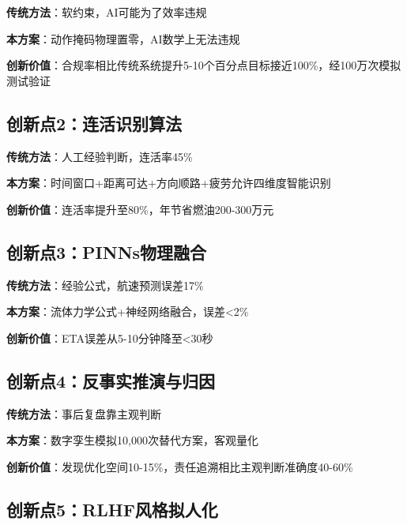 \documentclass[12pt,a4paper]{article}
\begin{document}
\begin{tcolorbox}[colback=red!5!white,colframe=red!75!black,title=创新对比]
\textbf{传统方法}：软约束，AI可能为了效率违规

\textbf{本方案}：动作掩码物理置零，AI数学上无法违规

\textbf{创新价值}：合规率相比传统系统提升5-10个百分点目标接近100\%，经100万次模拟测试验证
\end{tcolorbox}

\subsection{创新点2：连活识别算法}

\begin{tcolorbox}[colback=green!5!white,colframe=green!75!black,title=创新对比]
\textbf{传统方法}：人工经验判断，连活率45\%

\textbf{本方案}：时间窗口+距离可达+方向顺路+疲劳允许四维度智能识别

\textbf{创新价值}：连活率提升至80\%，年节省燃油200-300万元
\end{tcolorbox}

\subsection{创新点3：PINNs物理融合}

\begin{tcolorbox}[colback=blue!5!white,colframe=blue!75!black,title=创新对比]
\textbf{传统方法}：经验公式，航速预测误差17\%

\textbf{本方案}：流体力学公式+神经网络融合，误差<2\%

\textbf{创新价值}：ETA误差从5-10分钟降至<30秒
\end{tcolorbox}

\subsection{创新点4：反事实推演与归因}

\begin{tcolorbox}[colback=orange!5!white,colframe=orange!75!black,title=创新对比]
\textbf{传统方法}：事后复盘靠主观判断

\textbf{本方案}：数字孪生模拟10,000次替代方案，客观量化

\textbf{创新价值}：发现优化空间10-15\%，责任追溯相比主观判断准确度40-60\%
\end{tcolorbox}

\subsection{创新点5：RLHF风格拟人化}
\end{document}

